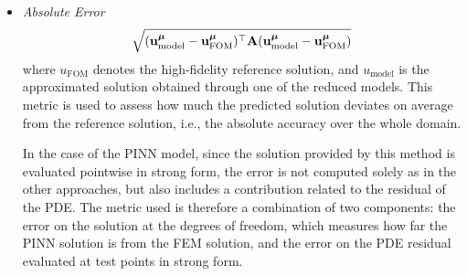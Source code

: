 \documentclass[
    conference,
    nofonttune,
    11pt
]{IEEEtran}
\begin{document}
                \begin{itemize}
                \item{\textit{Absolute Error}}  %
                  $$
                      \sqrt{
                        ({\mathbf u}^{\boldsymbol\mu}_{\text{model}}-{\mathbf u}^{\boldsymbol\mu}_{\text{FOM}})^\top
                        {\mathbf A}
                        ({\mathbf u}_{\text{model}}^{\boldsymbol\mu} - {\mathbf u}^{\boldsymbol\mu}_{\text{FOM}})
                    }
                  $$
                  where $u_{\text{FOM}}$ denotes the high-fidelity reference solution, and $u_{\text{model}}$ is the approximated solution obtained through one of the reduced models. This metric is used to assess how much the predicted solution deviates on average from the reference solution, i.e., the absolute accuracy over the whole domain.
                
                  In the case of the PINN model, since the solution provided by this method is evaluated pointwise in strong form, the error is not computed solely as in the other approaches, but also includes a contribution related to the residual of the PDE. The metric used is therefore a combination of two components: the error on the solution at the degrees of freedom, which measures how far the PINN solution is from the FEM solution, and the error on the PDE residual evaluated at test points in strong form.
                    

\end{itemize}
\end{document}
